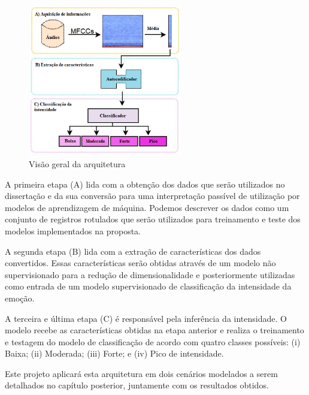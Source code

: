 \begin{figure}[]
\centering
\includegraphics[width=0.60\textwidth]{img/arquitetura-visao-geral-3.png}
\caption{\label{fig:visaogeralproposta}Visão geral da arquitetura}
\end{figure}

A primeira etapa (A) lida com a obtenção dos dados que serão utilizados no dissertação e da sua conversão para uma interpretação passível de utilização por modelos de aprendizagem de máquina. Podemos descrever os dados como um conjunto de registros rotulados que serão utilizados para treinamento e teste dos modelos implementados na proposta.

A segunda etapa (B) lida com a extração de características dos dados convertidos. Essas características serão obtidas através de um modelo não supervisionado para a redução de dimensionalidade e posteriormente utilizadas como entrada de um modelo supervisionado de classificação da intensidade da emoção.

A terceira e última etapa (C) é responsável pela inferência da intensidade. O modelo recebe as características obtidas na etapa anterior e realiza o treinamento e testagem do modelo de classificação de acordo com quatro classes possíveis: (i) Baixa; (ii) Moderada; (iii) Forte; e (iv) Pico de intensidade.

Este projeto aplicará esta arquitetura em dois cenários modelados a serem detalhados no capítulo posterior, juntamente com os resultados obtidos.


